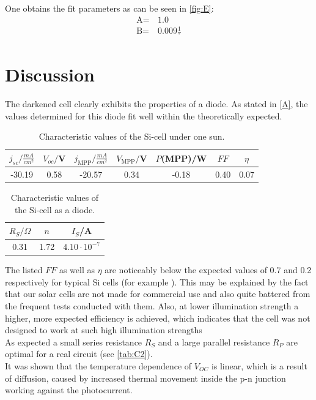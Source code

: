 \documentclass[english,  %
parskip=full,  %
headsepline]{scrartcl}
\newcommand{\ten}[1]{\cdot10^{#1}}
\begin{document}
One obtains the fit parameters as can be seen in \cref{fig:E}:
\begin{align*}
\text{A}=&\, 1.0 \\
\text{B}=& \,0.009\frac{1}{^{\circ}}
\end{align*}
\pagebreak
\section{Discussion}
The darkened cell clearly exhibits the properties of a diode. As stated in \cref{A}, the values determined for this diode fit well within the theoretically expected.\\
\begin{table}[H]
    \centering
    \begin{tabular}{c|c|c|c|c|c|c}
         $j_{sc}/\si{\frac{mA}{cm^2}}$&$V_{oc}/$V&$j_{\text{MPP}}/\si{\frac{mA}{cm^2}}$&$V_{\text{MPP}}/$V&$P$(MPP)/W&$FF$&$\eta$  \\\hline
        -30.19& 0.58 &-20.57  & 0.34& -0.18 & 0.40 & 0.07
    \end{tabular}
    \caption{Characteristic values of the Si-cell under one sun.}
    \label{tab:my_label}
\end{table}
\begin{table}[H]
    \centering
    \begin{tabular}{c|c|c}
         $R_S/\Omega$&$n$&$I_S$/A\\\hline
         0.31&1.72&$4.10\ten{-7}$
    \end{tabular}
    \caption{Characteristic values of the Si-cell as a diode.}
    \label{tab:my_label}
\end{table}
The listed $FF$ as well as $\eta$ are noticeably below the expected values of 0.7 and 0.2 respectively for typical Si cells (for example \cite{bsolar}). This may be explained by the fact that our solar cells are not made for commercial use and also quite battered from the frequent tests conducted with them. Also, at lower illumination strength a higher, more expected efficiency is achieved, which indicates that the cell was not designed to work at such high illumination strengths\\
As expected a small series resistance $R_S$ and a large parallel resistance $R_P$ are optimal for a real circuit (see \cref{tab:C2}). \\
It was shown that the temperature dependence of $V_{OC}$ is linear, which is a result of diffusion, caused by increased thermal movement inside the p-n junction working against the photocurrent.\\
\end{document}
